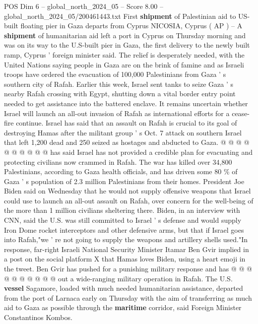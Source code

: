 \begin{textsample}{POS Dim 6 – global\_north\_2024\_05 – Score 8.00 – global\_north\_2024\_05/200461443.txt}  \label{ex:f6_pos_161}
First \textbf{shipment} of Palestinian aid to US-built floating pier in Gaza departs from Cyprus NICOSIA, Cyprus ( AP ) -- A \textbf{shipment} of humanitarian aid left a port in Cyprus on Thursday morning and was on its way to the U.S-built pier in Gaza, the first delivery to the newly built ramp, Cyprus ' foreign minister said.
The relief is desperately needed, with the United Nations saying people in Gaza are on the brink of famine and as Israeli troops have ordered the evacuation of 100,000 Palestinians from Gaza ' s southern city of Rafah.
Earlier this week, Israel sent tanks to seize Gaza ' s nearby Rafah crossing with Egypt, shutting down a vital border entry point needed to get assistance into the battered enclave.
It remains uncertain whether Israel will launch an all-out invasion of Rafah as international efforts for a cease-fire continue.
Israel has said that an assault on Rafah is crucial to its goal of destroying Hamas after the militant group ' s Oct. 7 attack on southern Israel that left 1,200 dead and 250 seized as hostages and abducted to Gaza. @ @ @ @ @ @ @ @ @ @ has said Israel has not provided a credible plan for evacuating and protecting civilians now crammed in Rafah.
The war has killed over 34,800 Palestinians, according to Gaza health officials, and has driven some 80 \% of Gaza ' s population of 2.3 million Palestinians from their homes.
President Joe Biden said on Wednesday that he would not supply offensive weapons that Israel could use to launch an all-out assault on Rafah, over concern for the well-being of the more than 1 million civilians sheltering there.
Biden, in an interview with CNN, said the U.S. was still committed to Israel ' s defense and would supply Iron Dome rocket interceptors and other defensive arms, but that if Israel goes into Rafah,"we ' re not going to supply the weapons and artillery shells used."In response, far-right Israeli National Security Minister Itamar Ben Gvir implied in a post on the social platform X that Hamas loves Biden, using a heart emoji in the tweet.
Ben Gvir has pushed for a punishing military response and has @ @ @ @ @ @ @ @ @ @ out a wide-ranging military operation in Rafah.
The U.S. \textbf{vessel} Sagamore, loaded with much needed humanitarian assistance, departed from the port of Larnaca early on Thursday with the aim of transferring as much aid to Gaza as possible through the \textbf{maritime} corridor, said Foreign Minister Constantinos Kombos.

\end{textsample}
